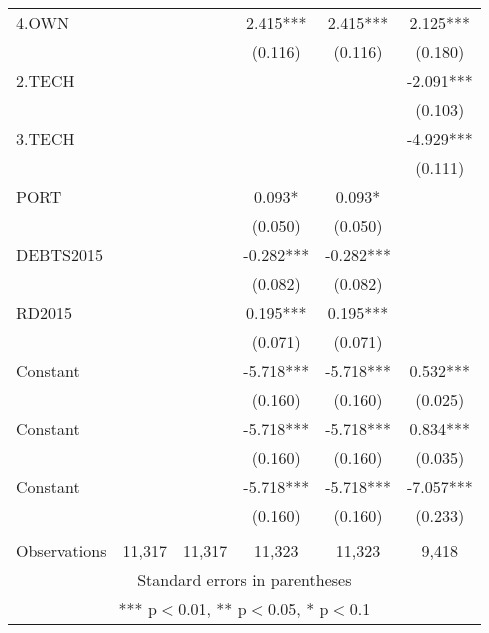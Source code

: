 \documentclass[]{article}
\begin{document}
\begin{landscape}
\begin{adjustbox}{width=1\textwidth}
\begin{tabular}{lccccc}
4.OWN &  &  & 2.415*** & 2.415*** & 2.125*** \\
 &  &  & (0.116) & (0.116) & (0.180) \\
2.TECH &  &  &  &  & -2.091*** \\
 &  &  &  &  & (0.103) \\
3.TECH &  &  &  &  & -4.929*** \\
 &  &  &  &  & (0.111) \\
PORT &  &  & 0.093* & 0.093* &  \\
 &  &  & (0.050) & (0.050) &  \\
DEBTS2015 &  &  & -0.282*** & -0.282*** &  \\
 &  &  & (0.082) & (0.082) &  \\
RD2015 &  &  & 0.195*** & 0.195*** &  \\
 &  &  & (0.071) & (0.071) &  \\
Constant &  &  & -5.718*** & -5.718*** & 0.532*** \\
 &  &  & (0.160) & (0.160) & (0.025) \\
Constant &  &  & -5.718*** & -5.718*** & 0.834*** \\
 &  &  & (0.160) & (0.160) & (0.035) \\
Constant &  &  & -5.718*** & -5.718*** & -7.057*** \\
 &  &  & (0.160) & (0.160) & (0.233) \\
 &  &  &  &  &  \\
 Observations & 11,317 & 11,317 & 11,323 & 11,323 & 9,418 \\ \hline
\multicolumn{6}{c}{ Standard errors in parentheses} \\
\multicolumn{6}{c}{ *** p$<$0.01, ** p$<$0.05, * p$<$0.1} \\
\end{tabular}
\end{adjustbox}
\end{landscape}
\end{document}
